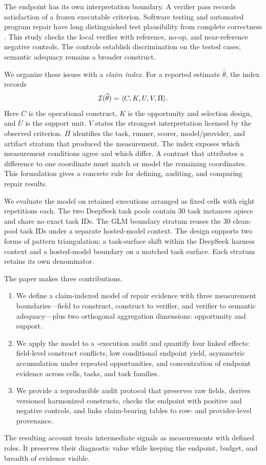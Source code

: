 The endpoint has its own interpretation boundary. A verifier pass records satisfaction of a frozen executable criterion. Software testing and automated program repair have long distinguished test plausibility from complete correctness \citep{barr2015oracle,qi2015plausibility,smith2015overfitting,le2019reliability}. This study checks the local verifier with reference, no-op, and near-reference negative controls. The controls establish discrimination on the tested cases; semantic adequacy remains a broader construct.

We organize these issues with a \emph{claim index}. For a reported estimate $\widehat\theta$, the index records
\[
\mathcal{I}(\widehat\theta)=\langle C,K,U,V,\Pi\rangle.
\]
Here $C$ is the operational construct, $K$ is the opportunity and selection design, and $U$ is the support unit. $V$ states the strongest interpretation licensed by the observed criterion. $\Pi$ identifies the task, runner, scorer, model/provider, and artifact stratum that produced the measurement. The index exposes which measurement conditions agree and which differ. A contrast that attributes a difference to one coordinate must match or model the remaining coordinates. This formulation gives a concrete rule for defining, auditing, and comparing repair results.

We evaluate the model on \TotalRows{} retained executions arranged as \TotalCells{} fixed cells with eight repetitions each. The two DeepSeek task pools contain 30 task instances apiece and share no exact task IDs. The GLM boundary stratum reuses the 30 clean-pool task IDs under a separate hosted-model context. The design supports two forms of pattern triangulation: a task-surface shift within the DeepSeek harness context and a hosted-model boundary on a matched task surface. Each stratum retains its own denominator.

The paper makes three contributions.
\begin{enumerate}
    \item We define a claim-indexed model of repair evidence with three measurement boundaries---field to construct, construct to verifier, and verifier to semantic adequacy---plus two orthogonal aggregation dimensions: opportunity and support.
    \item We apply the model to a \TotalRows-execution audit and quantify four linked effects: field-level construct conflicts, low conditional endpoint yield, asymmetric accumulation under repeated opportunities, and concentration of endpoint evidence across cells, tasks, and task families.
    \item We provide a reproducible audit protocol that preserves raw fields, derives versioned harmonized constructs, checks the endpoint with positive and negative controls, and links claim-bearing tables to row- and provider-level provenance.
\end{enumerate}

The resulting account treats intermediate signals as measurements with defined roles. It preserves their diagnostic value while keeping the endpoint, budget, and breadth of evidence visible.
